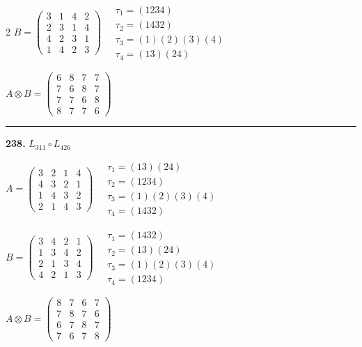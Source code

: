 \begin{multicols}{2}
$B = \begin{pmatrix} 3 & 1 & 4 & 2 \\ 2 & 3 & 1 & 4 \\ 4 & 2 & 3 & 1 \\ 1 & 4 & 2 & 3 \end{pmatrix} \quad \begin{matrix} \tau_{1}=(1 2 3 4) \\ \tau_{2}=(1 4 3 2) \\ \tau_{3}=(1)(2)(3)(4) \\ \tau_{4}=(1 3)(2 4) \end{matrix}$

$A \otimes B = \begin{pmatrix} 6 & 8 & 7 & 7 \\ 7 & 6 & 8 & 7 \\ 7 & 7 & 6 & 8 \\ 8 & 7 & 7 & 6 \end{pmatrix}$

\vspace{0.3em}
\hrule
\vspace{0.3em}

\noindent\textbf{238.} $L_{311} \circ L_{426}$

$A = \begin{pmatrix} 3 & 2 & 1 & 4 \\ 4 & 3 & 2 & 1 \\ 1 & 4 & 3 & 2 \\ 2 & 1 & 4 & 3 \end{pmatrix} \quad \begin{matrix} \tau_{1}=(1 3)(2 4) \\ \tau_{2}=(1 2 3 4) \\ \tau_{3}=(1)(2)(3)(4) \\ \tau_{4}=(1 4 3 2) \end{matrix}$

$B = \begin{pmatrix} 3 & 4 & 2 & 1 \\ 1 & 3 & 4 & 2 \\ 2 & 1 & 3 & 4 \\ 4 & 2 & 1 & 3 \end{pmatrix} \quad \begin{matrix} \tau_{1}=(1 4 3 2) \\ \tau_{2}=(1 3)(2 4) \\ \tau_{3}=(1)(2)(3)(4) \\ \tau_{4}=(1 2 3 4) \end{matrix}$

$A \otimes B = \begin{pmatrix} 8 & 7 & 6 & 7 \\ 7 & 8 & 7 & 6 \\ 6 & 7 & 8 & 7 \\ 7 & 6 & 7 & 8 \end{pmatrix}$


\end{multicols}
